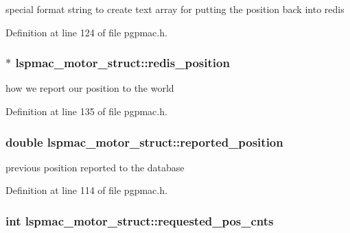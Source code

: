special format string to create text array for putting the position back into redis 



Definition at line 124 of file pgpmac.\-h.

\hypertarget{structlspmac__motor__struct_af94a0b2611136058ead4948fd7c858e3}{
\subsubsection[{redis\-\_\-position}]{$\ast$ lspmac\-\_\-motor\-\_\-struct\-::redis\-\_\-position}}\label{structlspmac__motor__struct_af94a0b2611136058ead4948fd7c858e3}


how we report our position to the world 



Definition at line 135 of file pgpmac.\-h.

\hypertarget{structlspmac__motor__struct_ae5f1f605a0f587500e627332ad4e5e7e}{
\subsubsection[{reported\-\_\-position}]{\setlength{\rightskip}{0pt plus 5cm}double lspmac\-\_\-motor\-\_\-struct\-::reported\-\_\-position}}\label{structlspmac__motor__struct_ae5f1f605a0f587500e627332ad4e5e7e}


previous position reported to the database 



Definition at line 114 of file pgpmac.\-h.

\hypertarget{structlspmac__motor__struct_a6e8dc9c11dc52a439fe9837230f93ce2}{
\subsubsection[{requested\-\_\-pos\-\_\-cnts}]{\setlength{\rightskip}{0pt plus 5cm}int lspmac\-\_\-motor\-\_\-struct\-::requested\-\_\-pos\-\_\-cnts}}\label{structlspmac__motor__struct_a6e8dc9c11dc52a439fe9837230f93ce2}


